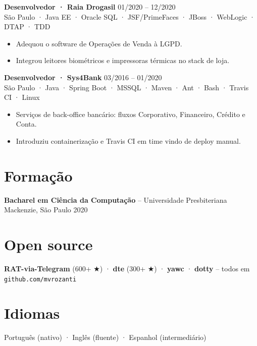 \documentclass[11pt,a4paper]{article}
\begin{document}
\noindent\textbf{Desenvolvedor · Raia Drogasil} \hfill 01/2020 -- 12/2020\\
{\small\color{muted}São Paulo · Java EE · Oracle SQL · JSF/PrimeFaces · JBoss · WebLogic · DTAP · TDD}
\begin{itemize}
\item Adequou o software de Operações de Venda à LGPD.
\item Integrou leitores biométricos e impressoras térmicas no stack de loja.
\end{itemize}

\noindent\textbf{Desenvolvedor · Sys4Bank} \hfill 03/2016 -- 01/2020\\
{\small\color{muted}São Paulo · Java · Spring Boot · MSSQL · Maven · Ant · Bash · Travis CI · Linux}
\begin{itemize}
\item Serviços de back-office bancário: fluxos Corporativo, Financeiro, Crédito e Conta.
\item Introduziu containerização e Travis CI em time vindo de deploy manual.
\end{itemize}

\section{Formação}
\noindent\textbf{Bacharel em Ciência da Computação} -- Universidade Presbiteriana Mackenzie, São Paulo \hfill 2020

\section{Open source}
\noindent
\textbf{RAT-via-Telegram} (600+ ★) · \textbf{dte} (300+ ★) · \textbf{yawc} · \textbf{dotty} -- todos em \texttt{github.com/mvrozanti}

\section{Idiomas}
Português (nativo) · Inglês (fluente) · Espanhol (intermediário)
\end{document}
